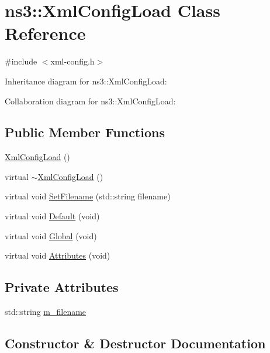 \hypertarget{classns3_1_1XmlConfigLoad}{}\section{ns3\+:\+:Xml\+Config\+Load Class Reference}
\label{classns3_1_1XmlConfigLoad}


{\ttfamily \#include $<$xml-\/config.\+h$>$}



Inheritance diagram for ns3\+:\+:Xml\+Config\+Load\+:


Collaboration diagram for ns3\+:\+:Xml\+Config\+Load\+:
\subsection*{Public Member Functions}
\begin{DoxyCompactItemize}
\item 
\hyperlink{classns3_1_1XmlConfigLoad_af36176cdd95752f00afbe6a557155b14}{Xml\+Config\+Load} ()
\item 
virtual \hyperlink{classns3_1_1XmlConfigLoad_a473c27dadeaa5ef4ed4704e7028d2a13}{$\sim$\+Xml\+Config\+Load} ()
\item 
virtual void \hyperlink{classns3_1_1XmlConfigLoad_a2037a30710dad9fc39ec0b0cc4ad6d0f}{Set\+Filename} (std\+::string filename)
\item 
virtual void \hyperlink{classns3_1_1XmlConfigLoad_a349463fab8b3214a009e916e4cf57f14}{Default} (void)
\item 
virtual void \hyperlink{classns3_1_1XmlConfigLoad_ab0174240a6457248afa9280ac4a4b609}{Global} (void)
\item 
virtual void \hyperlink{classns3_1_1XmlConfigLoad_a277f3313b27e4eb91f4c8b6969348905}{Attributes} (void)
\end{DoxyCompactItemize}
\subsection*{Private Attributes}
\begin{DoxyCompactItemize}
\item 
std\+::string \hyperlink{classns3_1_1XmlConfigLoad_a8214344f421f9916919684829b0a129a}{m\+\_\+filename}
\end{DoxyCompactItemize}


\subsection{Constructor \& Destructor Documentation}
